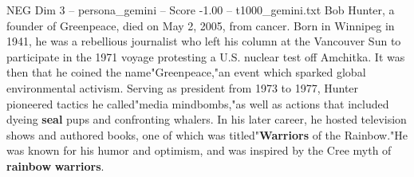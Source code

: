 \begin{textsample}{NEG Dim 3 – persona\_gemini – Score -1.00 – t1000\_gemini.txt}  \label{ex:f3_neg_004}
Bob Hunter, a founder of Greenpeace, died on May 2, 2005, from cancer.
Born in Winnipeg in 1941, he was a rebellious journalist who left his column at the Vancouver Sun to participate in the 1971 voyage protesting a U.S. nuclear test off Amchitka.
It was then that he coined the name"Greenpeace,"an event which sparked global environmental activism.
Serving as president from 1973 to 1977, Hunter pioneered tactics he called"media mindbombs,"as well as actions that included dyeing \textbf{seal} pups and confronting whalers.
In his later career, he hosted television shows and authored books, one of which was titled"\textbf{Warriors} of the Rainbow."He was known for his humor and optimism, and was inspired by the Cree myth of \textbf{rainbow} \textbf{warriors}.

\end{textsample}
